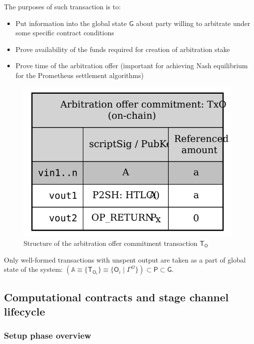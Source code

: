 \documentclass[a4paper]{article}
\providecommand{\tightlist}{%
  \setlength{\itemsep}{0pt}%
  \setlength{\parskip}{0pt}%
  \setlength{\topsep}{0pt}}
\begin{document}
The purposes of such transaction is to:
\begin{itemize}[topsep=0pt]
    \tightlist
    \item Put information into the global state $\mathsf{G}$ about party willing to arbitrate under some specific contract conditions
    \item Prove availability of the funds required for creation of arbitration stake
    \item Prove time of the arbitration offer (important for achieving Nash equilibrium for the Prometheus settlement algorithms)
\end{itemize}

\begin{figure}[h!]
    \centering
    \includegraphics[scale=0.75]{assets/txo.pdf}
    \caption{Structure of the arbitration offer commitment transaction $\mathsf{T_O}$}
    \label{fig:txo}
\end{figure}

Only well-formed transactions with unspent output are taken as a part of global state of the system: $(\mathbb{A} \equiv \{ \mathsf{T}_{\mathsf{O}_i} \} \equiv \{ \mathsf{O}_i \mid \Gamma^\Omega \}) \subset \mathsf{P} \subset \mathsf{G}$.

\subsection{Computational contracts and stage channel lifecycle}
\label{lifecycle}

\subsubsection{Setup phase overview}
\end{document}
